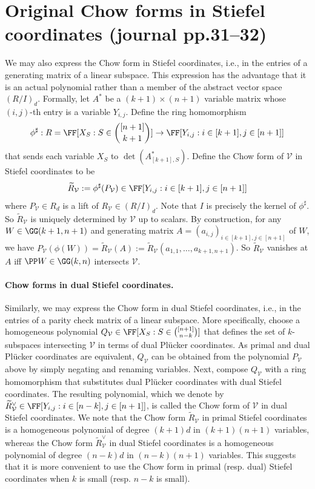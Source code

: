 \section*{Original Chow forms in Stiefel coordinates (journal pp.31--32)}
We may also express the Chow form in Stiefel coordinates, i.e., in the entries of a generating matrix of a linear subspace. This expression has the advantage that it is an actual polynomial rather than a member of the abstract vector space $(R/I)_d$.
Formally, let $A^*$ be a $(k+1)\times(n+1)$ variable matrix whose $(i,j)$-th entry is a variable $Y_{i,j}$. Define the ring homomorphism
\[\phi^\sharp:R=\FF[X_S:S\in\binom{[n+1]}{k+1}]\to\FF[Y_{i,j}:i\in[k+1],j\in[n+1]]\]
that sends each variable $X_S$ to $\det(A^*_{[k+1],S})$. Define the Chow form of $\mathcal V$ in Stiefel coordinates to be
\[\widetilde R_{\mathcal V}:=\phi^\sharp(P_{\mathcal V})\in\FF[Y_{i,j}:i\in[k+1],j\in[n+1]]\]
where $P_{\mathcal V}\in R_d$ is a lift of $R_{\mathcal V}\in(R/I)_d$. Note that $I$ is precisely the kernel of $\phi^\sharp$. So $\widetilde R_{\mathcal V}$ is uniquely determined by $\mathcal V$ up to scalars. By construction, for any $W\in\GG(k+1,n+1)$ and generating matrix $A=(a_{i,j})_{i\in[k+1],j\in[n+1]}$ of $W$, we have $P_{\mathcal V}(\phi(W))=\widetilde R_{\mathcal V}(A):=\widetilde R_{\mathcal V}(a_{1,1},\ldots,a_{k+1,n+1})$. So $\widetilde R_{\mathcal V}$ vanishes at $A$ iff $\PP W\in\GG(k,n)$ intersects $\mathcal V$.
\paragraph{Chow forms in dual Stiefel coordinates.}
Similarly, we may express the Chow form in dual Stiefel coordinates, i.e., in the entries of a parity check matrix of a linear subspace.
More specifically, choose a homogeneous polynomial $Q_{\mathcal V}\in\FF[X_S:S\in\binom{[n+1]}{n-k}]$ that defines the set of $k$-subspaces intersecting $\mathcal V$ in terms of dual Pl\"ucker coordinates. As primal and dual Pl\"ucker coordinates are equivalent, $Q_{\mathcal V}$ can be obtained from the polynomial $P_{\mathcal V}$ above by simply negating and renaming variables. Next, compose $Q_{\mathcal V}$ with a ring homomorphism that substitutes dual Pl\"ucker coordinates with dual Stiefel coordinates. The resulting polynomial, which we denote by $\widetilde R^\vee_{\mathcal V}\in\FF[Y_{i,j}:i\in[n-k],j\in[n+1]]$, is called the Chow form of $\mathcal V$ in dual Stiefel coordinates.
We note that the Chow form $\widetilde R_{\mathcal V}$ in primal Stiefel coordinates is a homogeneous polynomial of degree $(k+1)d$ in $(k+1)(n+1)$ variables, whereas the Chow form $\widetilde R^\vee_{\mathcal V}$ in dual Stiefel coordinates is a homogeneous polynomial of degree $(n-k)d$ in $(n-k)(n+1)$ variables. This suggests that it is more convenient to use the Chow form in primal (resp. dual) Stiefel coordinates when $k$ is small (resp. $n-k$ is small).
